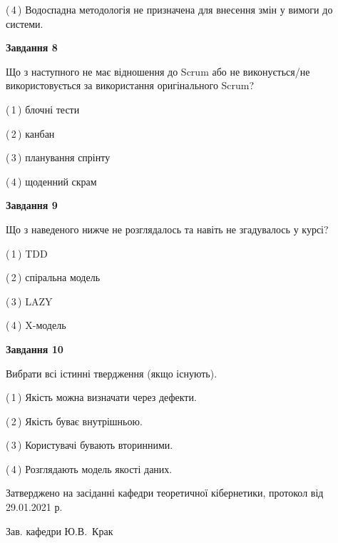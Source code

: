 \documentclass[10pt, ukrainian]{article}
\begin{document}
{\begin {large}
(\,4\,) Водоспадна методологія не призначена для внесення змін у вимоги до системи. %


{\begin {center}\textbf{Завдання 8}\end {center}}\par
Що з наступного не має відношення до Scrum або не виконується/не використовується за використання оригінального Scrum?\par
\vspace{2mm}



(\,1\,) блочні тести%



(\,2\,) канбан%



(\,3\,) планування спрінту%



(\,4\,) щоденний скрам%


{\begin {center}\textbf{Завдання 9}\end {center}}\par
Що з наведеного нижче не розглядалось та навіть не згадувалось у курсі?\par
\vspace{2mm}



(\,1\,) TDD%



(\,2\,) спіральна модель%



(\,3\,) LAZY%



(\,4\,) X-модель%


{\begin {center}\textbf{Завдання 10}\end {center}}\par
Вибрати всі істинні твердження (якщо існують).\par
\vspace{2mm}



(\,1\,) Якість можна визначати через дефекти.%



(\,2\,) Якість буває внутрішньою.%



(\,3\,) Користувачі бувають вторинними.%



(\,4\,) Розглядають модель якості даних.%



\end {large}}
{\vspace{5mm}\smallskip \begin {small} Затверджено на засіданні кафедри теоретичної кібернетики, протокол  від   29.01.2021 р.\par\smallskip\smallskip
{\parbox {6.5 cm}{Зав. кафедри \dotfill Ю.В.~Крак}} \end{small}}
\newpage
\end{document}
